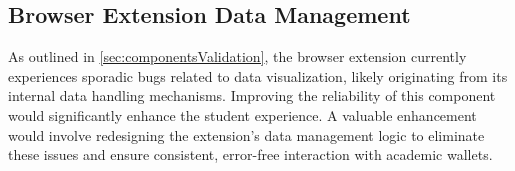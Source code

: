 \subsection{Browser Extension Data Management}
As outlined in \cref{sec:componentsValidation}, the browser extension currently experiences sporadic bugs related to data visualization, likely originating from its internal data handling mechanisms. Improving the reliability of this component would significantly enhance the student experience. A valuable enhancement would involve redesigning the extension’s data management logic to eliminate these issues and ensure consistent, error-free interaction with academic wallets.